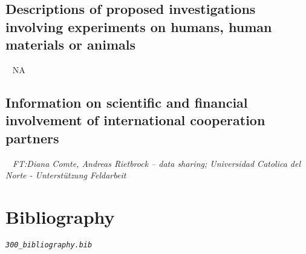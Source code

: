 \documentclass[11pt]{article}
\providecommand{\currfilename}{}
\newcommand{\showfile}{{\bf \tt \color{blue} \currfilename}}
\newcommand{\note}[1]{{\it \color{red} #1}}
\newcommand{\noteft}[1]{{\it \color{magenta} FT:#1}}
\newcommand{\note}[1]{}
\newcommand{\noteft}[1]{}
\newcommand{\showfile}{}
\begin{document}


\subsection{Descriptions of proposed investigations involving experiments on humans, human materials or animals}
\showfile
NA

\subsection{Information on scientific and financial involvement of international cooperation partners}
\showfile
\noteft{Diana Comte, Andreas Rietbrock -- data sharing; Universidad Catolica del Norte - Unterstützung Feldarbeit}




\section{Bibliography}
\note{\tt 300\_bibliography.bib}

\begingroup
\footnotesize
\setlength{\bibsep}{0pt plus 0.3ex}
\end{document}
